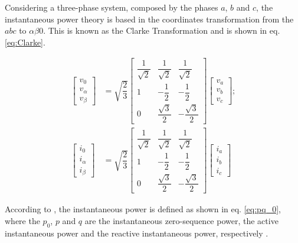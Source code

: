 Considering a three-phase system, composed by the phases $a$, $b$ and $c$, the instantaneous power theory is based in the coordinates transformation from the $abc$ to $\alpha \beta 0 $. This is known as the Clarke Transformation and is shown in eq. \ref{eq:Clarke}.


\begin{equation}
\begin{aligned}
\begin{bmatrix}
v_0\\
v_\alpha\\
v_\beta
\end{bmatrix}
& = \sqrt{\dfrac{2}{3}}
\begin{bmatrix}
\dfrac{1}{\sqrt{2}}	& \dfrac{1}{\sqrt{2}}	& \dfrac{1}{\sqrt{2}}		\\[2ex]
1					& -\dfrac{1}{2}			& -\dfrac{1}{2}				\\[2ex]
0					& \dfrac{\sqrt{3}}{2}	& -\dfrac{\sqrt{3}}{2}
\end{bmatrix}
\begin{bmatrix}
v_a\\
v_b\\
v_c
\end{bmatrix}
;\\
\begin{bmatrix}
i_0\\
i_\alpha\\
i_\beta
\end{bmatrix}
& = \sqrt{\dfrac{2}{3}}
\begin{bmatrix}
\dfrac{1}{\sqrt{2}}	& \dfrac{1}{\sqrt{2}}	& \dfrac{1}{\sqrt{2}}		\\[2ex]
1					& -\dfrac{1}{2}			& -\dfrac{1}{2}				\\[2ex]
0					& \dfrac{\sqrt{3}}{2}	& -\dfrac{\sqrt{3}}{2}
\end{bmatrix}
\begin{bmatrix}
i_a\\
i_b\\
i_c
\end{bmatrix}
\label{eq:Clarke}
\end{aligned}
\end{equation} 

According to \citep{Akagi2007}, the instantaneous power is defined as shown in eq. \ref{eq:pq_0}, where the $p_0$, $p$ and $q$ are the instantaneous zero-sequence power, the active instantaneous power and the reactive instantaneous power, respectively \citep{Akagi2006,Peng1996}.

